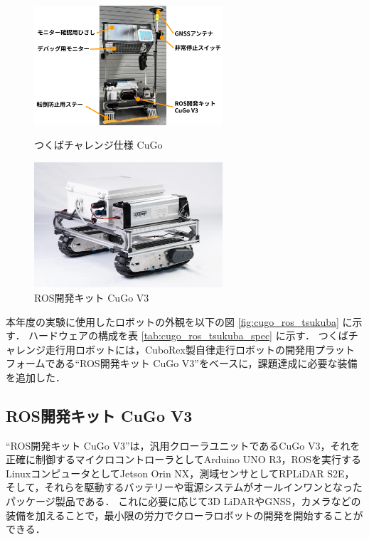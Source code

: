 \documentclass[platex,dvipdfmx]{rbproceedings}
\begin{document}
\begin{figure}[tbh]
   \begin{minipage}[b]{.45\linewidth}
       \centering
       \includegraphics[keepaspectratio,width=70mm]{fig/cugo_tsukuba.png}
       \caption{つくばチャレンジ仕様 CuGo}
       \label{fig:cugo_ros_tsukuba}
   \end{minipage}

   \begin{minipage}[b]{.45\linewidth}
       \centering   
       \includegraphics[keepaspectratio,width=70mm]{fig/cugo_ros.jpg}
       \caption{ROS開発キット CuGo V3}
       \label{fig:cugo_ros}
   \end{minipage}
\end{figure}




本年度の実験に使用したロボットの外観を以下の図 \ref{fig:cugo_ros_tsukuba} に示す．
ハードウェアの構成を表 \ref{tab:cugo_ros_tsukuba_spec} に示す．
つくばチャレンジ走行用ロボットには，CuboRex製自律走行ロボットの開発用プラットフォームである“ROS開発キット CuGo V3”をベースに，課題達成に必要な装備を追加した．

\subsection{ROS開発キット CuGo V3}
“ROS開発キット CuGo V3”は，汎用クローラユニットであるCuGo V3，それを正確に制御するマイクロコントローラとしてArduino UNO R3，ROSを実行するLinuxコンピュータとしてJetson Orin NX，測域センサとしてRPLiDAR S2E，そして，それらを駆動するバッテリーや電源システムがオールインワンとなったパッケージ製品である．
これに必要に応じて3D LiDARやGNSS，カメラなどの装備を加えることで，最小限の労力でクローラロボットの開発を開始することができる．
%
%
\end{document}
